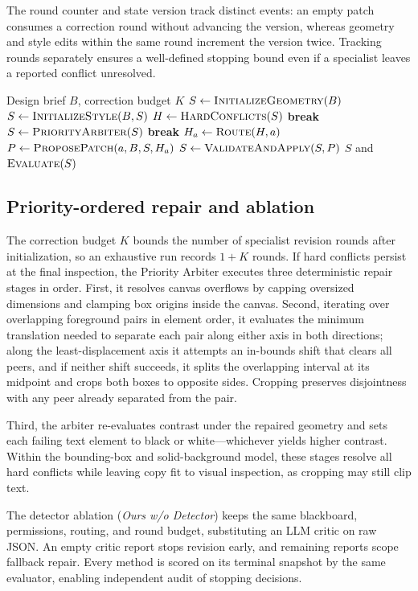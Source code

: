 The round counter and state version track distinct events: an empty patch
consumes a correction round without advancing the version, whereas geometry and
style edits within the same round increment the version twice. Tracking rounds
separately ensures a well-defined stopping bound even if a specialist leaves a
reported conflict unresolved.

\begin{algorithm}[t]
\caption{CoLayout with deterministic inspection}
\label{alg:colayout}
\begin{algorithmic}[1]
\Require Design brief \(B\), correction budget \(K\)
\State \(S \gets \Call{InitializeGeometry}{B}\)
\State \(S \gets \Call{InitializeStyle}{B,S}\)
  \State \(H \gets \Call{HardConflicts}{S}\)
   \State \textbf{break} \EndIf
     \State \(S \gets \Call{PriorityArbiter}{S}\)
     \State \textbf{break}
  \EndIf
     \State \(H_a \gets \Call{Route}{H,a}\)
        \State \(P \gets \Call{ProposePatch}{a,B,S,H_a}\)
        \State \(S \gets \Call{ValidateAndApply}{S,P}\)
     \EndIf
  \EndFor
\EndFor
\State \Return \(S\) and \(\Call{Evaluate}{S}\)
\end{algorithmic}
\end{algorithm}

\subsection{Priority-ordered repair and ablation}
The correction budget \(K\) bounds the number of specialist revision rounds
after initialization, so an exhaustive run records \(1+K\) rounds. If hard
conflicts persist at the final inspection, the Priority Arbiter executes three
deterministic repair stages in order. First, it resolves canvas overflows by
capping oversized dimensions and clamping box origins inside the canvas. Second,
iterating over overlapping foreground pairs in element order, it evaluates the
minimum translation needed to separate each pair along either axis in both
directions; along the least-displacement axis it attempts an in-bounds shift
that clears all peers, and if neither shift succeeds, it splits the overlapping
interval at its midpoint and crops both boxes to opposite sides. Cropping
preserves disjointness with any peer already separated from the pair.

Third, the arbiter re-evaluates contrast under the repaired geometry and sets
each failing text element to black or white---whichever yields higher contrast.
Within the bounding-box and solid-background model, these stages resolve all
hard conflicts while leaving copy fit to visual inspection, as cropping may
still clip text.



The detector ablation (\emph{Ours w/o Detector}) keeps the same blackboard,
permissions, routing, and round budget, substituting an LLM critic on raw JSON.
An empty critic report stops revision early, and remaining reports scope
fallback repair. \mbox{Every} method is scored on its terminal snapshot by the
same evaluator, enabling independent audit of stopping decisions.
